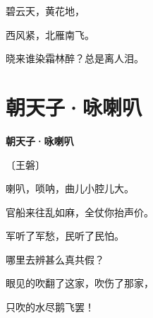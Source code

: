 \documentclass[12pt,UTF-8,openany,fontset=none]{ctexbook}
\begin{document}
    \vspace{18pt}  %

\begin{center}
    \begin{Large}

        碧云天，黄花地，

        西风紧，北雁南飞。

        晓来谁染霜林醉？总是离人泪。

    \end{Large}

\end{center}

\vspace{8pt}
\clearpage

\section{朝天子·咏喇叭}


\begin{center}
    {\bfseries 朝天子·咏喇叭}

    \vspace{18pt}

    \begin{large}\xuwen
        〔王磐〕
    \end{large}

\end{center}

    \vspace{18pt}  %

\begin{center}
    \begin{Large}

        喇叭，唢呐，曲儿小腔儿大。

        官船来往乱如麻，全仗你抬声价。

        \vspace{18pt}  %

        军听了军愁，民听了民怕。

        哪里去辨甚么真共假？

        \vspace{18pt}  %

        眼见的吹翻了这家，吹伤了那家，

        只吹的水尽鹅飞罢！

    \end{Large}

\end{center}
\end{document}
